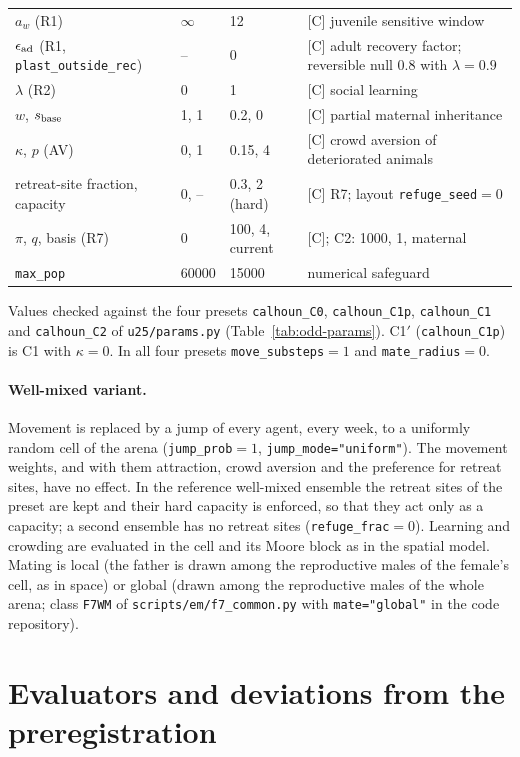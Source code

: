 \documentclass[preprint,12pt,authoryear]{elsarticle}
\begin{document}
{\begin{longtable}{@{}p{}p{}p{}p{}@{}}
$a_w$ (R1) & $\infty$ & 12 & [C] juvenile sensitive window \\
$\epsilon_{\rm ad}$ (R1, \texttt{plast\_outside\_rec}) & -- & 0 & [C] adult recovery factor; reversible null 0.8 with $\lambda=0.9$ \\
$\lambda$ (R2) & 0 & 1 & [C] social learning \\
$w$, $s_{\rm base}$ & 1, 1 & 0.2, 0 & [C] partial maternal inheritance \\
$\kappa$, $p$ (AV) & 0, 1 & 0.15, 4 & [C] crowd aversion of deteriorated animals \\
retreat-site fraction, capacity & 0, -- & 0.3, 2 (hard) & [C] R7; layout \texttt{refuge\_seed}${}=0$ \\
$\pi$, $q$, basis (R7) & 0 & 100, 4, current & [C]; \textsf{C2}: 1000, 1, maternal \\
\texttt{max\_pop} & 60000 & 15000 & numerical safeguard \\
\end{longtable}
}
Values checked against the four presets \texttt{calhoun\_C0}, \texttt{calhoun\_C1p}, \texttt{calhoun\_C1} and
\texttt{calhoun\_C2} of \texttt{u25/params.py} (Table~\ref{tab:odd-params}). \textsf{C1}$'$ (\texttt{calhoun\_C1p}) is
\textsf{C1} with $\kappa=0$. In all four presets \texttt{move\_substeps}${}=1$ and \texttt{mate\_radius}${}=0$.

\paragraph{Well-mixed variant.}
Movement is replaced by a jump of every agent, every week, to a uniformly random cell of the arena
(\texttt{jump\_prob}${}=1$, \texttt{jump\_mode="uniform"}). The movement weights, and with them attraction, crowd
aversion and the preference for retreat sites, have no effect. In the reference well-mixed ensemble the retreat sites
of the preset are kept and their hard capacity is enforced, so that they act only as a capacity; a second ensemble
has no retreat sites (\texttt{refuge\_frac}${}=0$). Learning and crowding are evaluated in the cell and its Moore block as in the spatial model. Mating is local
(the father is drawn among the reproductive males of the female's cell, as in space) or global (drawn among the
reproductive males of the whole arena; class \texttt{F7WM} of \texttt{scripts/em/f7\_common.py} with \texttt{mate="global"} in the code repository).

\section{Evaluators and deviations from the preregistration}
\label{supp:evaluators}
\end{document}
